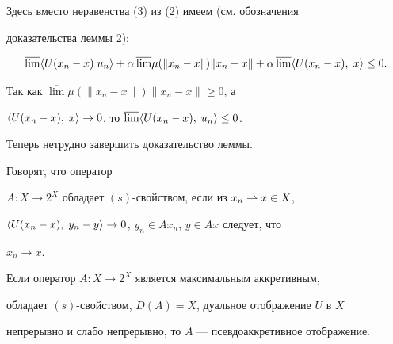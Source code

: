  


\begin{pf} Здесь вместо неравенства (3) из (2) имеем (см. обозначения 


доказательства леммы 2): 


$$ 


\overline{\lim}\la U(x_n-x)\;u_n\ra + 


\alpha\,\overline{\lim}\mu(\|x_n-x\|)\|x_n-x\|+ 


\alpha\,\overline{\lim}\la U(x_n-x),\;x\ra \le 0. 


$$ 


Так как $\overline{\lim}\mu(\|x_n-x\|)\|x_n-x\|\ge 0$, а 


$\langle U(x_n-x),\;x\rangle\to 0$, то $\overline{\lim}\langle U(x_n-x),\;u_n\rangle\le 0$. 


Теперь нетрудно завершить доказательство леммы. 


\end{pf} 


 


\begin{defn}


Говорят, что оператор 


$A:X\to 2^X$ обладает $(s)$-свойством, если из $x_n\rightharpoonup x\in X$, 


$\langle U(x_n-x),\;y_n-y\rangle\to 0$, $y_n\in Ax_n$, $y\in Ax$ следует, что 


$x_n\to x$. 


\end{defn} 


 


\begin{lem} Если оператор $A:X\to 2^X$ является максимальным аккретивным, 


обладает $(s)$-свойством, $D(A)=X$, дуальное отображение $U$ в $X$ 


непрерывно и слабо непрерывно, то $A$ --- псевдоаккретивное отображение. 


\end{lem} 


 


